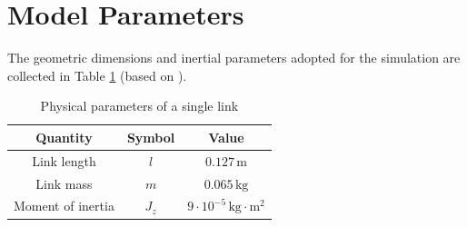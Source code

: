 \section{Model Parameters}
The geometric dimensions and inertial parameters adopted for the simulation are collected in Table \ref{tab:parametry_czlonu} (based on \cite{quanser, kkr}).

\begin{table}[!htbp]
    \centering
    \caption{Physical parameters of a single link}
    \label{tab:parametry_czlonu}
    \begin{tabular}{ccc}\toprule
        \textbf{Quantity} & \textbf{Symbol} & \textbf{Value} \\\midrule
        Link length & $l$ & $0.127\,\mathrm{m}$\\
        Link mass & $m$ & $0.065\,\mathrm{kg}$ \\
        Moment of inertia & $J_z$ & $9 \cdot 10^{-5}\,\mathrm{kg\cdot m^2}$ \\\bottomrule
    \end{tabular}
\end{table}